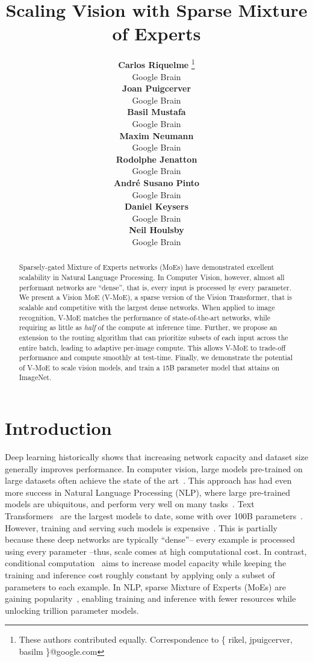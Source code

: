 \documentclass{article}
\title{Scaling Vision with Sparse Mixture of Experts}
\author{ {\bf Carlos Riquelme} \thanks{These authors contributed equally. Correspondence to \{ rikel, jpuigcerver, basilm \}@google.com} \\
Google Brain\\
\And
{\bf Joan Puigcerver} \printfnsymbol{1} \\
Google Brain\\
\And
{\bf Basil Mustafa} \printfnsymbol{1}  \\
Google Brain\\
\And
{\bf Maxim Neumann}   \\
Google Brain\\
\AND
{\bf Rodolphe Jenatton}   \\
Google Brain\\
\And
{\bf Andr\'e Susano Pinto}   \\
Google Brain\\
\And
{\bf Daniel Keysers}   \\
Google Brain\\ 
\And
{\bf Neil Houlsby}   \\
Google Brain\\
}
\newcommand{\name}{Vision MoE}
\newcommand{\abbv}{{V-MoE}}
\begin{document}
\maketitle
\begin{abstract}
Sparsely-gated Mixture of Experts networks (MoEs) have demonstrated excellent scalability in Natural Language Processing.
In Computer Vision, however, almost all performant networks are ``dense'', that is, every input is processed by every parameter.
We present a \name{} (\abbv{}), a sparse version of the Vision Transformer, that is scalable and competitive with the largest dense networks.
When applied to image recognition, \abbv{} matches the performance of state-of-the-art networks, while requiring as little as \emph{half} of the compute at inference time.
Further, we propose an extension to the routing algorithm that can prioritize subsets of each input across the entire batch, leading to adaptive per-image compute.
This allows \abbv{} to trade-off performance and compute smoothly at test-time.
Finally, we demonstrate the potential of \abbv{} to scale vision models, and train a 15B parameter model that attains  on ImageNet.


\end{abstract}
 \section{Introduction}

Deep learning historically shows that increasing network capacity and dataset size generally improves performance.
In computer vision, large models pre-trained on large datasets often achieve the state of the art~\cite{sun2017revisiting,raffel2019exploring,kolesnikov2019big,dosovitskiy2020image,arnab2021vivit}.
This approach has had even more success in Natural Language Processing (NLP), where large pre-trained models are ubiquitous, and perform very well on many tasks~\cite{peters2018elmo,devlin2019bert}.
Text Transformers~\cite{vaswani2017attention} are the largest models to date, some with over 100B parameters~\cite{brown2020language}.
However, training and serving such models is expensive~\cite{strubell2019energy,patterson2021carbon}.
This is partially because these deep networks are typically ``dense''-- every example is processed using every parameter --thus, scale comes at high computational cost.
In contrast, conditional computation~\cite{bengio2013deep} aims to increase model capacity while keeping the training and inference cost roughly constant by applying only a subset of parameters to each example.
In NLP, sparse Mixture of Experts (MoEs) are gaining popularity~\cite{shazeer2017outrageously,lepikhin2020gshard,fedus2021switch}, enabling training and inference with fewer resources while unlocking trillion parameter models.
\end{document}
